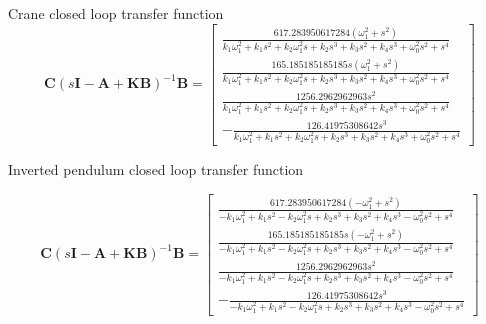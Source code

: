 \documentclass{article}
\begin{document}
Crane closed loop transfer function
\begin{equation}
  \mathbf{C} (s\mathbf{I} - \mathbf{A} + \mathbf{KB}) ^{-1} \mathbf{B} = \left[\begin{matrix}\frac{617.283950617284 \left(\omega_{1}^{2} + s^{2}\right)}{k_{1} \omega_{1}^{2} + k_{1} s^{2} + k_{2} \omega_{1}^{2} s + k_{2} s^{3} + k_{3} s^{2} + k_{4} s^{3} + \omega_{0}^{2} s^{2} + s^{4}}\\\frac{165.185185185185 s \left(\omega_{1}^{2} + s^{2}\right)}{k_{1} \omega_{1}^{2} + k_{1} s^{2} + k_{2} \omega_{1}^{2} s + k_{2} s^{3} + k_{3} s^{2} + k_{4} s^{3} + \omega_{0}^{2} s^{2} + s^{4}}\\\frac{1256.2962962963 s^{2}}{k_{1} \omega_{1}^{2} + k_{1} s^{2} + k_{2} \omega_{1}^{2} s + k_{2} s^{3} + k_{3} s^{2} + k_{4} s^{3} + \omega_{0}^{2} s^{2} + s^{4}}\\- \frac{126.41975308642 s^{3}}{k_{1} \omega_{1}^{2} + k_{1} s^{2} + k_{2} \omega_{1}^{2} s + k_{2} s^{3} + k_{3} s^{2} + k_{4} s^{3} + \omega_{0}^{2} s^{2} + s^{4}}\end{matrix}\right]
\end{equation}

Inverted pendulum closed loop transfer function

\begin{equation}
  \mathbf{C} (s\mathbf{I} - \mathbf{A} + \mathbf{KB}) ^{-1} \mathbf{B} = \left[\begin{matrix}\frac{617.283950617284 \left(- \omega_{1}^{2} + s^{2}\right)}{- k_{1} \omega_{1}^{2} + k_{1} s^{2} - k_{2} \omega_{1}^{2} s + k_{2} s^{3} + k_{3} s^{2} + k_{4} s^{3} - \omega_{0}^{2} s^{2} + s^{4}}\\\frac{165.185185185185 s \left(- \omega_{1}^{2} + s^{2}\right)}{- k_{1} \omega_{1}^{2} + k_{1} s^{2} - k_{2} \omega_{1}^{2} s + k_{2} s^{3} + k_{3} s^{2} + k_{4} s^{3} - \omega_{0}^{2} s^{2} + s^{4}}\\\frac{1256.2962962963 s^{2}}{- k_{1} \omega_{1}^{2} + k_{1} s^{2} - k_{2} \omega_{1}^{2} s + k_{2} s^{3} + k_{3} s^{2} + k_{4} s^{3} - \omega_{0}^{2} s^{2} + s^{4}}\\- \frac{126.41975308642 s^{3}}{- k_{1} \omega_{1}^{2} + k_{1} s^{2} - k_{2} \omega_{1}^{2} s + k_{2} s^{3} + k_{3} s^{2} + k_{4} s^{3} - \omega_{0}^{2} s^{2} + s^{4}}\end{matrix}\right]
\end{equation}

\newpage
\begin{thebibliography}{9}

\end{thebibliography}
\end{document}
